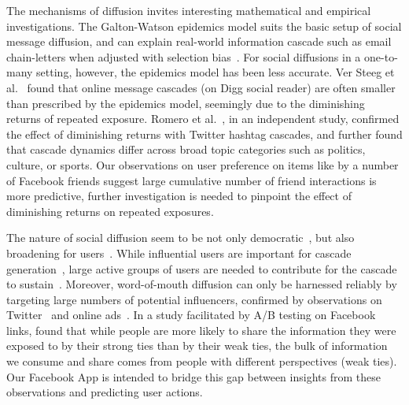 The mechanisms of diffusion invites interesting mathematical and empirical investigations. 
The Galton-Watson epidemics model suits the basic setup of social
message diffusion, and can explain real-world information cascade such as
email chain-letters when adjusted with selection
bias~\cite{Golub2010selectionbiase}. For social diffusions in a
one-to-many setting, however, the epidemics model has been less
accurate. Ver Steeg et al.~\cite{ver2011stops} found that online message cascades (on
Digg social reader) are often smaller than prescribed by the epidemics
model, seemingly due to the diminishing returns of repeated
exposure. Romero et al.~\cite{Romero2011hashtag}, in an independent study, confirmed
the effect of diminishing returns with Twitter hashtag cascades, and
further found that cascade dynamics differ across broad topic
categories such as politics, culture, or sports. 
Our observations on user preference on items like by a number of Facebook friends 
suggest large cumulative number of friend interactions is more predictive, 
further investigation is needed to pinpoint the effect of diminishing returns on repeated exposures.

The nature of social diffusion seem to be not only democratic~\cite{asur2011trends,Bakshy2011everyone}, but also broadening for users~\cite{Bakshy2012chamber}. While influential users are important for cascade generation~\cite{Bakshy2011everyone}, large active groups of users are needed to contribute for the cascade to sustain~\cite{asur2011trends}. Moreover, word-of-mouth diffusion can only be harnessed reliably by targeting large numbers of potential influencers, confirmed by observations on Twitter~\cite{Bakshy2011everyone} and online ads~\cite{influence}. In a study facilitated by A/B testing on Facebook links, \cite{Bakshy2012chamber} found that while people are more likely to share the information they were exposed to by their strong ties than by their weak ties, the bulk of information we consume and share comes from people with different perspectives (weak ties). Our Facebook App is intended to bridge this gap between insights from these observations and predicting user actions.

